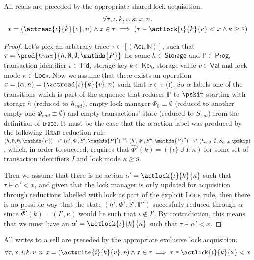 \lem \label{lem:read} All reads are preceded by the appropriate shared lock acquisition.
\begin{gather*}
\forall \tau, \iota, k, v, \kappa, x, n \ldotp \\
x = (\actread{\iota}{k}{v}, n) \land x \in \tau \implies \left( \tau \vDash \actlock{\iota}{k}{\kappa} < x \land \kappa \geq \textsc{s} \right)
\end{gather*}

\begin{proof}
Let's pick an arbitrary trace $\tau \in [(\mathsf{Act}, \mathds{N})]$, such that $\tau = \pred{trace}{h, \emptyset, \emptyset, \mathds{P}}$ for some $h \in \mathsf{Storage}$ and $\mathds{P} \in \mathsf{Prog}$, transaction identifier $\iota \in \mathsf{Tid}$, storage key $k \in \mathsf{Key}$, storage value $v \in \mathsf{Val}$ and lock mode $\kappa \in \mathsf{Lock}$. Now we assume that there exists an operation $x = (\alpha, n) = (\actread{\iota}{k}{v}, n)$ such that $x \in \tau$ (\textsc{i}). So $\alpha$ labels one of the transitions which is part of the sequence that reduces $\mathds{P}$ to $\pskip$ starting with storage $h$ (reduced to $h_{end}$), empty lock manager $\Phi_0 \equiv \emptyset$ (reduced to another empty one $\Phi_{end} \equiv \emptyset$) and empty transactions' state (reduced to $S_{end}$) from the definition of $\mathsf{trace}$. It must be the case that the $\alpha$ action label was produced by the following \textsc{Read} reduction rule $(h, \emptyset, \emptyset, \mathds{P}) \rightarrow^* (h', \Phi', S', \mathds{P}') \xrightarrow{\alpha} (h', \Phi', S'', \mathds{P}'') \rightarrow^* (h_{end}, \emptyset, S_{end}, \pskip)$, which, in order to succeed, requires that $\hat{\Phi}'(k) = (\{ \iota \} \cup I, \kappa)$ for some set of transaction identifiers $I$ and lock mode $\kappa \geq \textsc{s}$.

Then we assume that there is no action $\alpha' = \actlock{\iota}{k}{\kappa}$ such that $\tau \vDash \alpha' < x$, and given that the lock manager is only updated for acquisition through reductions labelled with \textsf{lock} as part of the explicit \textsc{Lock} rule, then there is no possible way that the state $(h', \Phi', S', \mathds{P}')$ succesfully reduced through $\alpha$ since $\hat{\Phi}'(k) = (I'
, \kappa)$ would be such that $\iota \not\in I'$. By contradiction, this means that we must have an $\alpha' = \actlock{\iota}{k}{\kappa}$ such that $\tau \vDash \alpha' < x$.
\end{proof}

\lem \label{lem:write} All writes to a cell are preceded by the appropriate exclusive lock acquisition.
\begin{gather*}
\forall \tau, x, i, k, v, n \ldotp
x = (\actwrite{i}{k}{v}, n) \land x \in \tau \implies
\tau \vDash \actlock{i}{k}{\textsc{x}} < x
\end{gather*}

